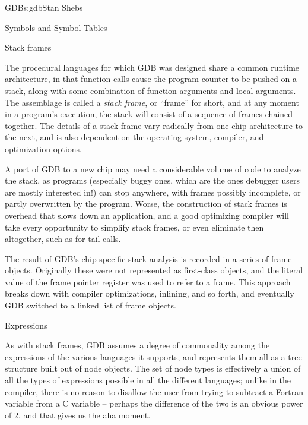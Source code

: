 \begin{aosachapter}{GDB}{s:gdb}{Stan Shebs}
\begin{aosasect2}{Symbols and Symbol Tables}
\end{aosasect2}

\begin{aosasect2}{Stack frames}

The procedural languages for which GDB was designed share a common
runtime architecture, in that function calls cause the program counter
to be pushed on a stack, along with some combination of function
arguments and local arguments.  The assemblage is called a {\em stack
frame}, or ``frame'' for short, and at any moment in a program's
execution, the stack will consist of a sequence of frames chained
together.  The details of a stack frame vary radically from one chip
architecture to the next, and is also dependent on the operating
system, compiler, and optimization options.

A port of GDB to a new chip may need a considerable volume of code to
analyze the stack, as programs (especially buggy ones, which are the
ones debugger users are mostly interested in!) can stop anywhere, with
frames possibly incomplete, or partly overwritten by the program.
Worse, the construction of stack frames is overhead that slows down an
application, and a good optimizing compiler will take every
opportunity to simplify stack frames, or even eliminate then
altogether, such as for tail calls.

The result of GDB's chip-specific stack analysis is recorded in a
series of frame objects.  Originally these were not represented as
first-class objects, and the literal value of the frame pointer
register was used to refer to a frame.  This approach breaks down with
compiler optimizations, inlining, and so forth, and eventually GDB
switched to a linked list of frame objects.

\end{aosasect2}

\begin{aosasect2}{Expressions}

As with stack frames, GDB assumes a degree of commonality among the
expressions of the various languages it supports, and represents them
all as a tree structure built out of node objects.  The set of node
types is effectively a union of all the types of expressions possible
in all the different languages; unlike in the compiler, there is no
reason to disallow the user from trying to subtract a Fortran variable
from a C variable -- perhaps the difference of the two is an obvious
power of 2, and that gives us the aha moment.

\end{aosasect2}


\end{aosachapter}
